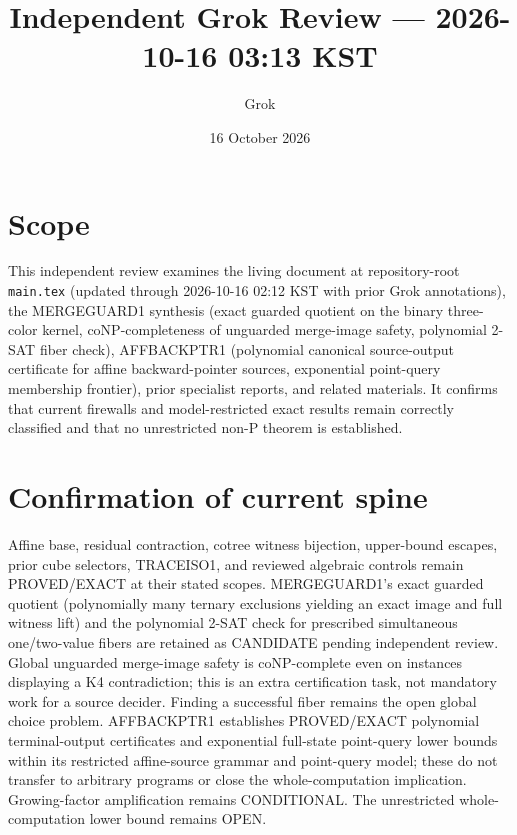 \documentclass[11pt]{article}
\title{Independent Grok Review --- 2026-10-16 03:13 KST}
\author{Grok}
\date{16 October 2026}
\begin{document}
\maketitle

\begin{center}
\end{center}

\section{Scope}
This independent review examines the living document at repository-root \texttt{main.tex} (updated through 2026-10-16 02:12 KST with prior Grok annotations), the MERGEGUARD1 synthesis (exact guarded quotient on the binary three-color kernel, coNP-completeness of unguarded merge-image safety, polynomial 2-SAT fiber check), AFFBACKPTR1 (polynomial canonical source-output certificate for affine backward-pointer sources, exponential point-query membership frontier), prior specialist reports, and related materials. It confirms that current firewalls and model-restricted exact results remain correctly classified and that no unrestricted non-P theorem is established.

\section{Confirmation of current spine}
Affine base, residual contraction, cotree witness bijection, upper-bound escapes, prior cube selectors, TRACEISO1, and reviewed algebraic controls remain PROVED/EXACT at their stated scopes. MERGEGUARD1's exact guarded quotient (polynomially many ternary exclusions yielding an exact image and full witness lift) and the polynomial 2-SAT check for prescribed simultaneous one/two-value fibers are retained as CANDIDATE pending independent review. Global unguarded merge-image safety is coNP-complete even on instances displaying a K4 contradiction; this is an extra certification task, not mandatory work for a source decider. Finding a successful fiber remains the open global choice problem. AFFBACKPTR1 establishes PROVED/EXACT polynomial terminal-output certificates and exponential full-state point-query lower bounds within its restricted affine-source grammar and point-query model; these do not transfer to arbitrary programs or close the whole-computation implication. Growing-factor amplification remains CONDITIONAL. The unrestricted whole-computation lower bound remains OPEN.
\end{document}
